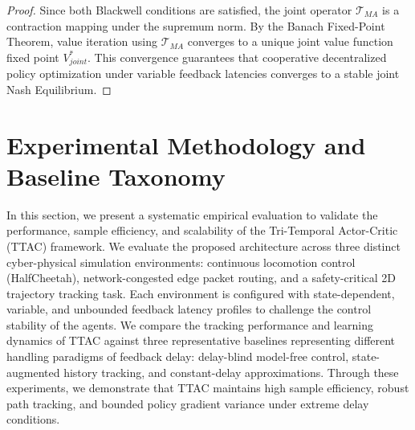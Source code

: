 \documentclass[manuscript, screen, review]{jair}
\begin{document}
\begin{proof}
Since both Blackwell conditions are satisfied, the joint operator $\mathcal{T}_{MA}$ is a contraction mapping under the supremum norm. By the Banach Fixed-Point Theorem, value iteration using $\mathcal{T}_{MA}$ converges to a unique joint value function fixed point $V_{joint}^*$. This convergence guarantees that cooperative decentralized policy optimization under variable feedback latencies converges to a stable joint Nash Equilibrium.
\end{proof}

\section{Experimental Methodology and Baseline Taxonomy}\label{sec:experimental}
In this section, we present a systematic empirical evaluation to validate the performance, sample efficiency, and scalability of the Tri-Temporal Actor-Critic (TTAC) framework. We evaluate the proposed architecture across three distinct cyber-physical simulation environments: continuous locomotion control (HalfCheetah), network-congested edge packet routing, and a safety-critical 2D trajectory tracking task. Each environment is configured with state-dependent, variable, and unbounded feedback latency profiles to challenge the control stability of the agents. We compare the tracking performance and learning dynamics of TTAC against three representative baselines representing different handling paradigms of feedback delay: delay-blind model-free control, state-augmented history tracking, and constant-delay approximations. Through these experiments, we demonstrate that TTAC maintains high sample efficiency, robust path tracking, and bounded policy gradient variance under extreme delay conditions.
\end{document}
